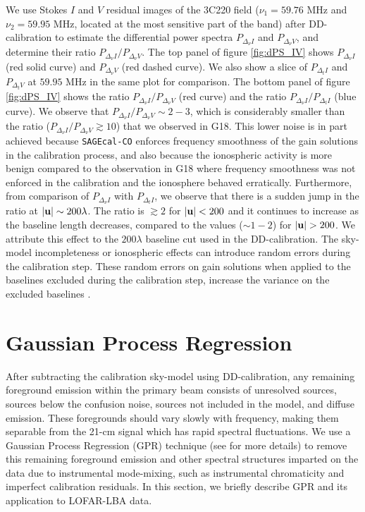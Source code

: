 \documentclass[fleqn,usenatbib]{mnras}
\begin{document}
We use Stokes $I$ and $V$ residual images of the 3C220 field ($\nu_1 = 59.76$ MHz and $\nu_2 = 59.95$ MHz, located at the most sensitive part of the band) after DD-calibration to estimate the differential power spectra $P_{\Delta_{\nu} I}$ and $P_{\Delta_{\nu} V}$, and determine their ratio $P_{\Delta_{\nu} I}/P_{\Delta_{\nu} V}$. The top panel of figure \ref{fig:dPS_IV} shows $P_{\Delta_{\nu} I}$ (red solid curve) and $P_{\Delta_{\nu} V}$ (red dashed curve). We also show a slice of $P_{\Delta_{t} I}$ and $P_{\Delta_{t} V}$ at $59.95$ MHz in the same plot for comparison. The bottom panel of figure \ref{fig:dPS_IV} shows the ratio $P_{\Delta_{\nu} I}/P_{\Delta_{\nu} V}$ (red curve) and the ratio $P_{\Delta_{\nu} I}/P_{\Delta_{t} I}$ (blue curve). We observe that $P_{\Delta_{\nu} I}/P_{\Delta_{\nu} V} \sim 2-3$, which is considerably smaller than the ratio ($P_{\Delta_{\nu} I}/P_{\Delta_{\nu} V} \gtrsim 10$) that we observed in G18. This lower noise is in part achieved because \texttt{SAGEcal-CO} enforces frequency smoothness of the gain solutions in the calibration process, and also because the ionospheric activity is more benign compared to the observation in G18 where frequency smoothness was not enforced in the calibration and the ionosphere behaved erratically. Furthermore, from comparison of $P_{\Delta_{\nu} I}$ with $P_{\Delta_{t} I}$, we observe that there is a sudden jump in the ratio at $|{\it \textbf{u}}|\sim 200\lambda$. The ratio is $\gtrsim 2$ for $|{\it \textbf{u}}| < 200$ and it continues to increase as the baseline length decreases, compared to the values ($\sim 1-2$) for $|{\it \textbf{u}}| > 200$. We attribute this effect to the $200\lambda$ baseline cut used in the DD-calibration. The sky-model incompleteness or ionospheric effects can introduce random errors during the calibration step. These random errors on gain solutions when applied to the baselines excluded during the calibration step, increase the variance on the excluded baselines \citep{patil2016,barry2016,ewall-wice2016,ewall-wice2017,gehlot2018,sardarabadi2018}.

\section{Gaussian Process Regression}\label{sec:GPR}

After subtracting the calibration sky-model using DD-calibration, any remaining foreground emission within the primary beam consists of unresolved sources, sources below the confusion noise, sources not included in the model, and diffuse emission. These foregrounds should vary slowly with frequency, making them separable from the 21-cm signal which has rapid spectral fluctuations. We use a Gaussian Process Regression (GPR) technique (see \citealt{mertens2018} for more details) to remove this remaining foreground emission and other spectral structures imparted on the data due to instrumental mode-mixing, such as instrumental chromaticity and imperfect calibration residuals. In this section, we briefly describe GPR and its application to LOFAR-LBA data.
\end{document}

